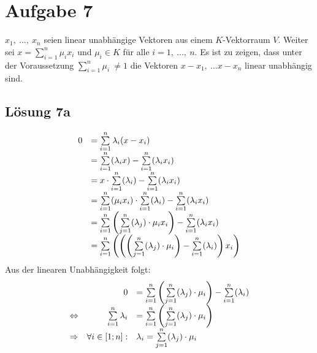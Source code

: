 \documentclass[main.tex]{subfiles}
\begin{document}
\section{Aufgabe 7}

$x_{1} ,\ \dotsc ,\ x_{n}$ seien linear unabhängige Vektoren aus einem $K$-Vektorraum $V$. Weiter sei $x=\sum _{i=1}^{n} \mu _{i} x_{i}$ und $\mu _{i} \in K$ für alle $i=1,\ \dotsc ,\ n$. Es ist zu zeigen, dass unter der Voraussetzung $\sum _{i=1}^{n} \mu _{i} \ \neq 1$ die Vektoren $x-x_{1} ,\ \dotsc x-x_{n}$ linear unabhängig sind.

\subsection{Lösung 7a}

\begin{equation*}
    \begin{array}{ c l }
        0 & =\sum\limits _{i=1}^{n} \lambda _{i}( x-x_{i})\\
        & =\sum\limits _{i=1}^{n}( \lambda _{i} x) -\sum\limits _{i=1}^{n}( \lambda _{i} x_{i})\\
        & =x\cdotp \sum\limits _{i=1}^{n}( \lambda _{i}) -\sum\limits _{i=1}^{n}( \lambda _{i} x_{i})\\
        & =\sum\limits _{i=1}^{n}( \mu _{i} x_{i}) \cdotp \sum\limits _{i=1}^{n}( \lambda _{i}) -\sum\limits _{i=1}^{n}( \lambda _{i} x_{i})\\
        & =\sum\limits _{i=1}^{n}\left(\sum\limits _{j=1}^{n}( \lambda _{j}) \cdotp \mu _{i} x_{i}\right) -\sum\limits _{i=1}^{n}( \lambda _{i} x_{i})\\
        & =\sum\limits _{i=1}^{n}\left(\left(\left(\sum\limits _{j=1}^{n}( \lambda _{j}) \cdotp \mu _{i}\right) -\sum\limits _{i=1}^{n}( \lambda _{i})\right) x_{i}\right)
    \end{array}
\end{equation*}
Aus der linearen Unabhängigkeit folgt:
\begin{equation*}
    \begin{array}{ c r l }
        & 0 & =\sum\limits _{i=1}^{n}\left(\sum\limits _{j=1}^{n}( \lambda _{j}) \cdotp \mu _{i}\right) -\sum\limits _{i=1}^{n}( \lambda _{i})\\
        \Leftrightarrow  & \sum\limits _{i=1}^{n} \lambda _{i} & =\sum\limits _{i=1}^{n}\left(\sum\limits _{j=1}^{n}( \lambda _{j}) \cdotp \mu _{i}\right)\\
        \Rightarrow  & \forall i\in [ 1;n] : & \lambda _{i} =\sum\limits _{j=1}^{n}( \lambda _{j}) \cdotp \mu _{i}
    \end{array}
\end{equation*}
\end{document}
